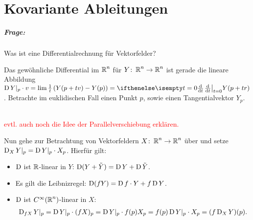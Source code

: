 
\chapter{Kovariante Ableitungen}

\paragraph{Frage:} Was ist eine  Differentialrechnung für Vektorfelder?

Das gewöhnliche Differential im $\operatorname{\mathbb{R}}^n$ für $Y \colon \operatorname{\mathbb{R}}^n \to \operatorname{\mathbb{R}}^n$ ist gerade die lineare Abbildung $\D Y|_p \cdot v = \lim \frac{1}t \left(Y(p+tv) -Y(p)\right) = \difffrac[t=0]{}{t} Y(p+tr)$.
Betrachte im euklidischen Fall einen Punkt $p$, sowie einen Tangentialvektor $Y_p$.
\begin{center}\\
\textcolor{red}{evtl. auch noch die Idee der Parallelverschiebung erklären.}\end{center}

Nun gehe zur Betrachtung von Vektorfeldern $X \colon \operatorname{\mathbb{R}}^n \to \operatorname{\mathbb{R}}^n$ über und setze $\operatorname{D}_XY|_p = \operatorname{D} Y|_p\cdot X_p$. Hierfür gilt:
\begin{itemize}
\item $\operatorname{D}$ ist $\operatorname{\mathbb{R}}$-linear in $Y$: $\operatorname{D}(Y + \tilde Y) = \operatorname{D} Y + \operatorname{D} \tilde Y$.
\item Es gilt die Leibnizregel: $\operatorname{D}(fY) = \operatorname{D} f \cdot Y + f\operatorname{D} Y$.
\item $\operatorname{D}$ ist $C^{\infty}(\operatorname{\mathbb{R}}^n)$-linear in $X$:
  \begin{align*}
    \operatorname{D}_{fX}Y|_p = \operatorname{D} Y|_p\cdot(fX)_p = \operatorname{D} Y|_p \cdot f(p)X_p = f(p) \operatorname{D} Y|_p \cdot X_p = (f \operatorname{D}_XY)(p).
  \end{align*}
\end{itemize}

